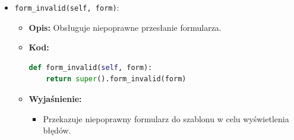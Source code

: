 \documentclass[12pt,a4paper,oneside]{article}
\theoremstyle{definition}
\numberwithin{equation}{section}
\begin{document}
\begin{itemize}
\begin{itemize}
\begin{itemize}
\begin{itemize}
            \end{itemize}
        \end{itemize}
        \item \texttt{form\_invalid(self, form)}:
        \begin{itemize}
            \item \textbf{Opis:} Obsługuje niepoprawne przesłanie formularza.
            \item \textbf{Kod:}
            \begin{lstlisting}[language=Python, caption=Metoda form\_invalid w UserRegisterView]
def form_invalid(self, form):
    return super().form_invalid(form)
            \end{lstlisting}
            \item \textbf{Wyjaśnienie:}
            \begin{itemize}
                \item Przekazuje niepoprawny formularz do szablonu w celu wyświetlenia błędów.
            \end{itemize}
        \end{itemize}
    \end{itemize}
\end{itemize}
\end{document}
